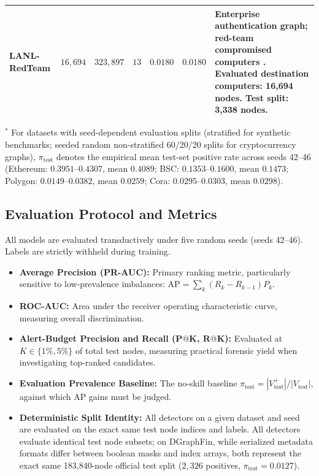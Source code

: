 \documentclass[applsci,article,submit,moreauthors,pdftex]{Definitions/mdpi}
\begin{document}
\begin{table}[htbp]
\begin{tabularx}{\textwidth}{lrrrrr>{\raggedright\arraybackslash}X}
LANL-RedTeam & $16,694$ & $323,897$ & $13$ & $0.0180$ & $0.0180$ & Enterprise authentication graph; red-team compromised computers \cite{kent2015cyberdata}. Evaluated destination computers: 16,694 nodes. Test split: 3,338 nodes. \\
\bottomrule
\end{tabularx}
\begin{tablenotes}\footnotesize
\item $^*$ For datasets with seed-dependent evaluation splits (stratified for synthetic benchmarks; seeded random non-stratified 60/20/20 splits for cryptocurrency graphs), $\pi_{\mathrm{test}}$ denotes the empirical mean test-set positive rate across seeds 42--46 (Ethereum: $0.3951$--$0.4307$, mean $0.4089$; BSC: $0.1353$--$0.1600$, mean $0.1473$; Polygon: $0.0149$--$0.0382$, mean $0.0259$; Cora: $0.0295$--$0.0303$, mean $0.0298$).
\end{tablenotes}
\end{table}

\subsection{Evaluation Protocol and Metrics}
All models are evaluated transductively under five random seeds (seeds 42--46). Labels are strictly withheld during training.
\begin{itemize}
    \item \textbf{Average Precision (PR-AUC):} Primary ranking metric, particularly sensitive to low-prevalence imbalances: $\mathrm{AP} = \sum_k (R_k - R_{k-1}) P_k$.
    \item \textbf{ROC-AUC:} Area under the receiver operating characteristic curve, measuring overall discrimination.
    \item \textbf{Alert-Budget Precision and Recall ($\mathbf{P@K}$, $\mathbf{R@K}$):} Evaluated at $K \in \{1\%, 5\%\}$ of total test nodes, measuring practical forensic yield when investigating top-ranked candidates.
    \item \textbf{Evaluation Prevalence Baseline:} The no-skill baseline $\pi_{\mathrm{test}} = |V_{\mathrm{test}}^+| / |V_{\mathrm{test}}|$, against which AP gains must be judged.
    \item \textbf{Deterministic Split Identity:} All detectors on a given dataset and seed are evaluated on the exact same test node indices and labels. All detectors evaluate identical test node subsets; on DGraphFin, while serialized metadata formats differ between boolean masks and index arrays, both represent the exact same 183,840-node official test split ($2{,}326$ positives, $\pi_{\mathrm{test}} = 0.0127$).
\end{itemize}
\end{document}
